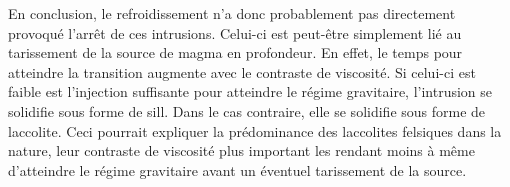 En   conclusion,  le   refroidissement  n’a   donc  probablement   pas
directement provoqué l’arrêt de ces intrusions. Celui-ci est peut-être
simplement lié au tarissement de la  source de magma en profondeur. En
effet,  le  temps  pour  atteindre  la  transition  augmente  avec  le
contraste  de  viscosité.  Si  celui-ci  est  faible  est  l'injection
suffisante  pour  atteindre  le   régime  gravitaire,  l'intrusion  se
solidifie sous forme de sill. Dans le cas contraire, elle se solidifie
sous forme de  laccolite. Ceci pourrait expliquer  la prédominance des
laccolites felsiques dans la nature,  leur contraste de viscosité plus
important les  rendant moins à  même d'atteindre le  régime gravitaire
avant un éventuel tarissement de la source.

